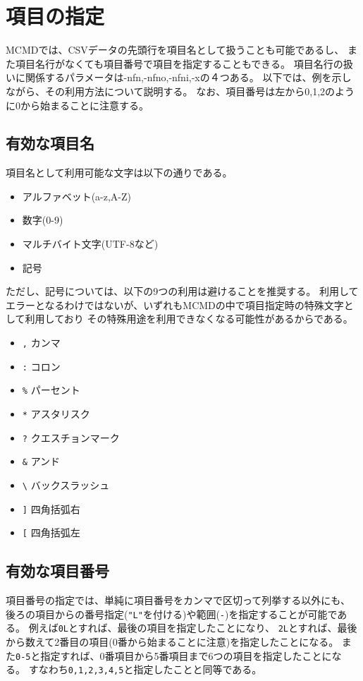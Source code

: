 
%

\section{項目の指定\label{sect:fieldname}}
MCMDでは、CSVデータの先頭行を項目名として扱うことも可能であるし、
また項目名行がなくても項目番号で項目を指定することもできる。
項目名行の扱いに関係するパラメータは-nfn,-nfno,-nfni,-xの４つある。
以下では、例を示しながら、その利用方法について説明する。
なお、項目番号は左から0,1,2のように0から始まることに注意する。



\subsection{有効な項目名}

項目名として利用可能な文字は以下の通りである。
\begin{itemize}
\item アルファベット(a-z,A-Z)
\item 数字(0-9)
\item マルチバイト文字(UTF-8など)
\item 記号
\end{itemize}

ただし、記号については、以下の9つの利用は避けることを推奨する。
利用してエラーとなるわけではないが、いずれもMCMDの中で項目指定時の特殊文字として利用しており
その特殊用途を利用できなくなる可能性があるからである。

\begin{itemize}
\item \verb|,| カンマ
\item \verb|:| コロン
\item \verb|%| パーセント
\item \verb|*| アスタリスク
\item \verb|?| クエスチョンマーク
\item \verb|&| アンド
\item \verb|\| バックスラッシュ
\item \verb|]| 四角括弧右
\item \verb|[| 四角括弧左
\end{itemize}

\subsection{有効な項目番号}

項目番号の指定では、単純に項目番号をカンマで区切って列挙する以外にも、
後ろの項目からの番号指定(\verb|"L"|を付ける)や範囲(\verb|-|)を指定することが可能である。
例えば\verb|0L|とすれば、最後の項目を指定したことになり、
\verb|2L|とすれば、最後から数えて2番目の項目(0番から始まることに注意)を指定したことになる。
また\verb|0-5|と指定すれば、0番項目から5番項目まで6つの項目を指定したことになる。
すなわち\verb|0,1,2,3,4,5|と指定したことと同等である。

